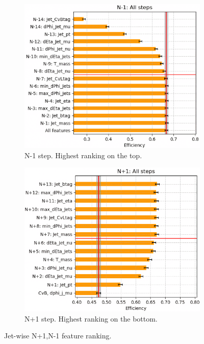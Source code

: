\begin{figure}[H]
    \centering
    \begin{subfigure}{0.9\linewidth}
        \includegraphics[width=1\linewidth]{fig//chap08-kin_reco/n_minus1_upscayl_2x_ultramix_balanced.png}
        \caption{N-1 step. Highest ranking on the top.}
    \end{subfigure}
    \hfill
    \begin{subfigure}{0.9\linewidth}   
        \includegraphics[width=1\linewidth]{fig//chap08-kin_reco/n_plus1_upscayl_2x_ultramix_balanced.png}
        \caption{N+1 step. Highest ranking on the bottom.}
    \end{subfigure}  
    \caption{Jet-wise N+1,N-1 feature ranking.}
    \label{fig:n_rank}
\end{figure}




